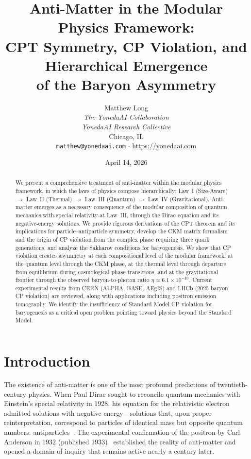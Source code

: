 \documentclass[12pt]{article}
\title{\textbf{Anti-Matter in the Modular Physics Framework:\\
CPT Symmetry, CP Violation, and Hierarchical Emergence\\
of the Baryon Asymmetry}}
\author{Matthew Long \\
\textit{The YonedaAI Collaboration} \\
\textit{YonedaAI Research Collective} \\
Chicago, IL \\
\texttt{matthew@yonedaai.com} $\cdot$ \url{https://yonedaai.com}}
\date{April 14, 2026}
\theoremstyle{definition}
\theoremstyle{remark}
\begin{document}
\maketitle

\begin{abstract}
We present a comprehensive treatment of anti-matter within the modular physics framework,
in which the laws of physics compose hierarchically: Law~I (Size-Aware) $\to$ Law~II
(Thermal) $\to$ Law~III (Quantum) $\to$ Law~IV (Gravitational). Anti-matter emerges
as a necessary consequence of the modular composition of quantum mechanics with special
relativity at Law~III, through the Dirac equation and its negative-energy solutions.
We provide rigorous derivations of the CPT theorem and its implications for particle--antiparticle
symmetry, develop the CKM matrix formalism and the origin of CP violation from the complex
phase requiring three quark generations, and analyze the Sakharov conditions for baryogenesis.
We show that CP violation creates asymmetry at each compositional level of the modular framework:
at the quantum level through the CKM phase, at the thermal level through departure from equilibrium
during cosmological phase transitions, and at the gravitational frontier through the observed
baryon-to-photon ratio $\eta \approx 6.1 \times 10^{-10}$. Current experimental results from
CERN (ALPHA, BASE, AEgIS) and LHCb (2025 baryon CP violation) are reviewed, along with
applications including positron emission tomography. We identify the insufficiency of
Standard Model CP violation for baryogenesis as a critical open problem pointing toward
physics beyond the Standard Model.
\end{abstract}

\tableofcontents
\newpage

\section{Introduction}
\label{sec:introduction}

The existence of anti-matter is one of the most profound predictions of twentieth-century
physics. When Paul Dirac sought to reconcile quantum mechanics with Einstein's special
relativity in 1928, his equation for the relativistic electron admitted solutions with
negative energy---solutions that, upon proper reinterpretation, correspond to particles
of identical mass but opposite quantum numbers: antiparticles~\cite{Dirac1928,Dirac1930}.
The experimental confirmation of the positron by Carl Anderson in 1932 (published 1933)~\cite{Anderson1933}
established the reality of anti-matter and opened a domain of inquiry that remains
active nearly a century later.
\end{document}
